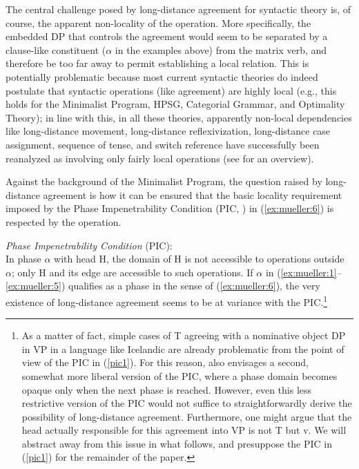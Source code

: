 \documentclass[output=paper
,modfonts
,nonflat]{langsci/langscibook}
\begin{document}
	The central challenge posed by long-distance agreement for syntactic
	theory is, of course, the apparent non-locality of the operation. More
	specifically, the embedded DP that controls the agreement would seem
	to be separated by a clause-like constituent ($\alpha$ in the examples
	above) from the matrix verb, and therefore be too far away to permit
	establishing a local relation.  This is potentially problematic
	because most current syntactic theories do indeed postulate that
	syntactic operations (like agreement) are highly local (e.g., this
	holds for the Minimalist Program, HPSG, Categorial Grammar, and Optimality
	Theory); in line with this, in all these theories, apparently
	non-local dependencies like long-distance movement, long-distance
	reflexivization, long-distance case assignment, sequence of tense, and
	switch reference have successfully been reanalyzed as involving only
	fairly local operations (see \citealt{Alexiadouetal:12} for an
	overview).
	
	Against the background of the Minimalist Program, the question raised
	by long-distance agreement is how it can be ensured that the basic
	locality requirement imposed by the Phase Impenetrability Condition
	(PIC, \citealt{Chomsky:00,Chomsky:01,Chomsky:08,Chomsky:13}) in (\ref{ex:mueller:6}) is
	respected by the operation. 
	
	\ea\label{ex:mueller:6} {\itshape Phase Impenetrability Condition} \label{pic1}(PIC):\\
	In phase $\alpha$ with head H, the domain of H is not accessible to
	operations outside $\alpha$; only H and its edge are accessible to such
	operations.
	\z
{\noindent}If $\alpha$ in (\ref{ex:mueller:1}--\ref{ex:mueller:5}) qualifies as a phase in the sense of
	(\ref{ex:mueller:6}), the very existence of long-distance agreement seems to be at
	variance with the PIC.\footnote{\label{fn1}As a matter of fact, simple cases of T
		agreeing with a nominative object DP in VP in a language like
		Icelandic are already problematic from the point of view of the PIC
		in (\ref{pic1}). For this reason, \citet{Chomsky:01} also envisages a
		second, somewhat more liberal version of the PIC, where a phase
		domain becomes opaque only when the next phase is reached. However, even
		this less restrictive version of the PIC would not suffice to
		straightforwardly derive the possibility of long-distance
		agreement. Furthermore, one might argue that the head actually
		responsible for this agreement into VP is not T but v. We will
		abstract away from this issue in what follows, and presuppose the
		PIC in (\ref{pic1}) for the remainder of the paper.}
	
\end{document}
